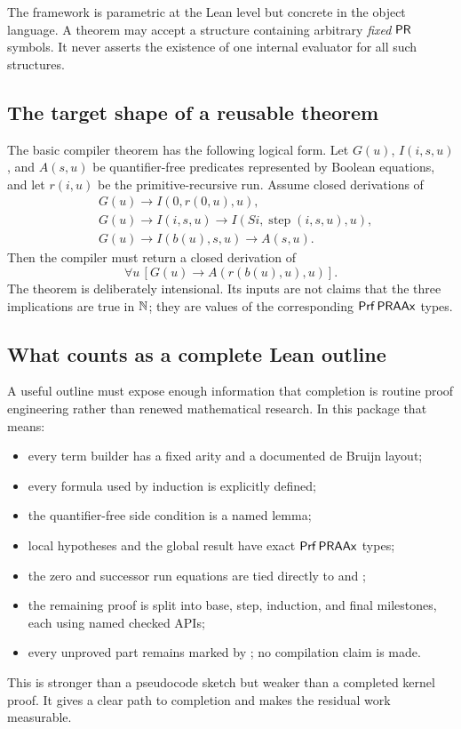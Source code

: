 The framework is parametric at the Lean level but concrete in the object
language.  A theorem may accept a structure containing arbitrary \emph{fixed}
\(\mathsf{PR}\) symbols.  It never asserts the existence of one internal evaluator for
all such structures.

\subsection{The target shape of a reusable theorem}

The basic compiler theorem has the following logical form.  Let
\(G(u)\), \(I(i,s,u)\), and \(A(s,u)\) be quantifier-free predicates represented
by Boolean equations, and let \(r(i,u)\) be the primitive-recursive run.
Assume closed derivations of
\begin{align*}
 &G(u)\to I(0,r(0,u),u), \\
 &G(u)\to I(i,s,u)\to I(Si,\operatorname{step}(i,s,u),u),\\
 &G(u)\to I(b(u),s,u)\to A(s,u).
\end{align*}
Then the compiler must return a closed derivation of
\[
   \forall u\,[G(u)\to A(r(b(u),u),u)].
\]
The theorem is deliberately intensional.  Its inputs are not claims that the
three implications are true in \(\mathbb N\); they are values of the corresponding
\(\mathsf{Prf}\,\mathsf{PRAAx}\) types.

\subsection{What counts as a complete Lean outline}

A useful outline must expose enough information that completion is routine
proof engineering rather than renewed mathematical research.  In this package
that means:
\begin{itemize}
\item every term builder has a fixed arity and a documented de Bruijn layout;
\item every formula used by induction is explicitly defined;
\item the quantifier-free side condition is a named lemma;
\item local hypotheses and the global result have exact
\(\mathsf{Prf}\,\mathsf{PRAAx}\) types;
\item the zero and successor run equations are tied directly to
 and ;
\item the remaining proof is split into base, step, induction, and final
milestones, each using named checked APIs;
\item every unproved part remains marked by ; no compilation claim
is made.
\end{itemize}

This is stronger than a pseudocode sketch but weaker than a completed kernel
proof.  It gives a clear path to completion and makes the residual work
measurable.

